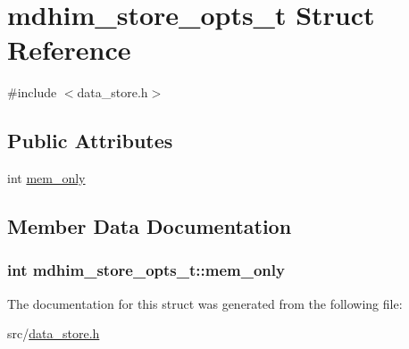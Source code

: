 \hypertarget{structmdhim__store__opts__t}{\section{mdhim\-\_\-store\-\_\-opts\-\_\-t Struct Reference}
\label{da/d76/structmdhim__store__opts__t}
}


{\ttfamily \#include $<$data\-\_\-store.\-h$>$}

\subsection*{Public Attributes}
\begin{DoxyCompactItemize}
\item 
int \hyperlink{structmdhim__store__opts__t_aea0a8ed44b255373255ab5423b394932}{mem\-\_\-only}
\end{DoxyCompactItemize}


\subsection{Member Data Documentation}
\hypertarget{structmdhim__store__opts__t_aea0a8ed44b255373255ab5423b394932}{
\subsubsection[{mem\-\_\-only}]{\setlength{\rightskip}{0pt plus 5cm}int mdhim\-\_\-store\-\_\-opts\-\_\-t\-::mem\-\_\-only}}\label{da/d76/structmdhim__store__opts__t_aea0a8ed44b255373255ab5423b394932}


The documentation for this struct was generated from the following file\-:\begin{DoxyCompactItemize}
\item 
src/\hyperlink{data__store_8h}{data\-\_\-store.\-h}\end{DoxyCompactItemize}
